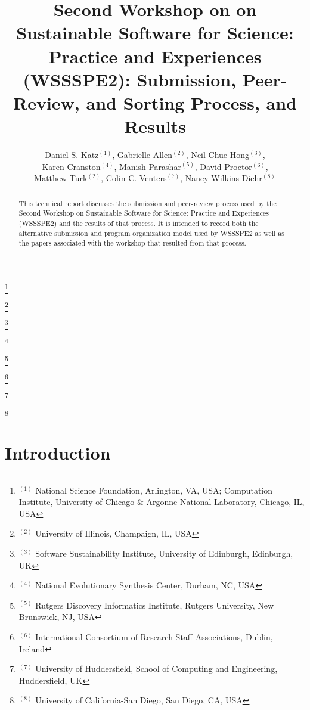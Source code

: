 \documentclass[11pt, oneside]{amsart}
\begin{document}
\title[]{Second Workshop on on Sustainable Software for Science: Practice and Experiences (WSSSPE2): Submission, Peer-Review, and Sorting Process, and Results}

\author{Daniel S. Katz$^{(1)}$, Gabrielle Allen$^{(2)}$, Neil Chue Hong$^{(3)}$, \\
Karen Cranston$^{(4)}$, Manish Parashar$^{(5)}$, David Proctor$^{(6)}$, \\
Matthew Turk$^{(2)}$, Colin C. Venters$^{(7)}$, Nancy Wilkins-Diehr$^{(8)}$}


\thanks{{}$^{(1)}$ National Science Foundation, Arlington, VA, USA; Computation Institute, University of Chicago \& Argonne National Laboratory, Chicago, IL, USA}

\thanks{{}$^{(2)}$ University of Illinois, Champaign, IL, USA}


\thanks{{}$^{(3)}$ Software Sustainability Institute, University of Edinburgh, Edinburgh, UK}
  
\thanks{{}$^{(4)}$ National Evolutionary Synthesis Center, Durham, NC, USA}

\thanks{{}$^{(5)}$ Rutgers Discovery Informatics Institute, Rutgers University, New Brunswick, NJ, USA}

\thanks{{}$^{(6)}$ International Consortium of Research Staff Associations, Dublin, Ireland}

\thanks{{}$^{(7)}$ University of Huddersfield, School of Computing and Engineering, Huddersfield, UK}

\thanks{{}$^{(8)}$ University of California-San Diego, San Diego, CA, USA}


    
\begin{abstract}
This technical report discusses the submission and peer-review process used by the Second Workshop on Sustainable Software for Science: Practice and Experiences (WSSSPE2) and the results of that process.  It is intended to record both the alternative submission and program organization model used by WSSSPE2 as well as the papers associated with the workshop that resulted from that process.
\end{abstract}



\maketitle


\section{Introduction}
\end{document}
